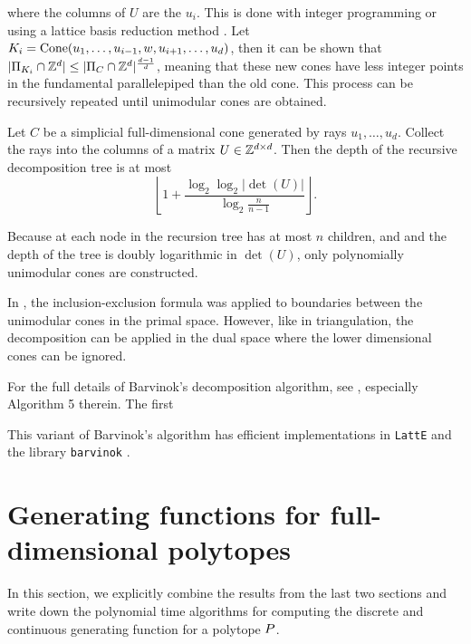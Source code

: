  where the columns of $U$ are the $u_i$. This is done with integer programming or using a lattice basis reduction method \cite{latte1}. Let $K_i = \operatorname{Cone}(u_1, \dots, u_{i-1}, w, u_{i+1}, \dots, u_d)$, then it can be shown that $|\Pi_{K_i} \cap {\mathbb Z}^d| \leq |\Pi_{C} \cap {\mathbb Z}^d|^{\frac{d-1}{d}}$, meaning that these new cones have less integer points in the fundamental parallelepiped than the old cone. This process can be recursively repeated until unimodular cones are obtained. 
 
\begin{theorem}
Let $C$ be a simplicial full-dimensional cone generated by rays $u_1, \dots, u_d$. Collect the rays into the columns of a matrix $U \in {\mathbb Z}^{d \times d}$. Then the depth of the recursive decomposition tree is at most 
\[ \left\lfloor 1 + \frac{\log_2 \log_2 |\det(U)|}{\log_2 \frac{n}{n-1}} \right\rfloor. \]
\end{theorem}

Because at each node in the recursion tree has at most $n$ children, and and the depth of the tree is doubly logarithmic in $\det(U)$, only polynomially unimodular cones are constructed. 

In \cite{bar}, the inclusion-exclusion formula was applied to boundaries between the unimodular cones in the primal space. However, like in triangulation, the decomposition can be applied in the dual space where the lower dimensional cones can be ignored. 

For the full details of Barvinok's decomposition algorithm, see \cite{latte1}, especially Algorithm 5 therein. The first 

This variant of Barvinok’s algorithm has
efficient implementations in \texttt{LattE}  \cite{latte-1.2} and the library \texttt{barvinok} \cite{barvinok-noversion}.


\section{Generating functions for full-dimensional polytopes}

In this section, we explicitly combine the results from the last two sections and write down the polynomial time algorithms for computing the discrete and continuous generating function for a polytope ${ P}$.

